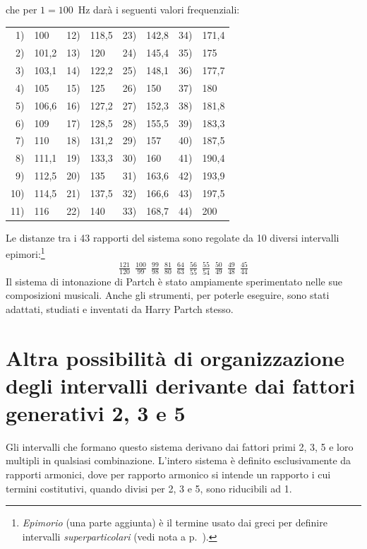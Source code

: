 che per $1 = 100$~Hz darà i seguenti valori frequenziali:

\begin{center}\small
\begin{tabular}{r l @{\qquad} r l @{\qquad} r l @{\qquad} r l}
   1) & 100   & 12) & 118,5 & 23) & 142,8 & 34) & 171,4 \\
   2) & 101,2 & 13) & 120   & 24) & 145,4 & 35) & 175 \\
   3) & 103,1 & 14) & 122,2 & 25) & 148,1 & 36) & 177,7 \\
   4) & 105   & 15) & 125   & 26) & 150   & 37) & 180 \\
   5) & 106,6 & 16) & 127,2 & 27) & 152,3 & 38) & 181,8 \\
   6) & 109   & 17) & 128,5 & 28) & 155,5 & 39) & 183,3 \\
   7) & 110   & 18) & 131,2 & 29) & 157   & 40) & 187,5 \\
   8) & 111,1 & 19) & 133,3 & 30) & 160   & 41) & 190,4 \\
   9) & 112,5 & 20) & 135   & 31) & 163,6 & 42) & 193,9 \\
  10) & 114,5 & 21) & 137,5 & 32) & 166,6 & 43) & 197,5 \\
  11) & 116   & 22) & 140   & 33) & 168,7 & 44) & 200 \\
\end{tabular}
\end{center}

Le distanze tra i 43 rapporti del sistema sono regolate da 10 diversi
intervalli epimori:\footnote{\emph{Epimorio} (una parte aggiunta) è il termine
usato dai greci per definire intervalli \emph{superparticolari} (vedi nota a
p.~\pageref{nota:superpart}).}
\[
  \tfrac{121}{120}\ \ \tfrac{100}{99}\ \ \tfrac{99}{98}\ \ \tfrac{81}{80}\ \
  \tfrac{64}{63}\ \ \tfrac{56}{55}\ \ \tfrac{55}{54}\ \ \tfrac{50}{49}\ \
  \tfrac{49}{48}\ \ \tfrac{45}{44}
\]
Il sistema di intonazione di Partch è stato ampiamente sperimentato nelle sue
composizioni musicali. Anche gli strumenti, per poterle eseguire, sono stati
adattati, studiati e inventati da Harry Partch stesso.

\section{Altra possibilità di organizzazione degli intervalli derivante dai
         fattori generativi 2, 3 e 5}

Gli intervalli che formano questo sistema derivano dai fattori primi 2, 3, 5 e
loro multipli in qualsiasi combinazione. L'intero sistema è definito
esclusivamente da rapporti armonici, dove per rapporto armonico si intende un
rapporto i cui termini costitutivi, quando divisi per 2, 3 e 5, sono riducibili
ad 1.

